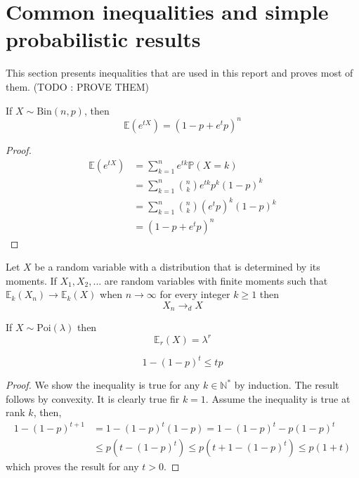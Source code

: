 \section{Common inequalities and simple probabilistic results}
This section presents inequalities that are used in this report and proves most of them. (TODO : PROVE THEM)
\begin{theorem}\label{binMGF}
	If $X \sim \text{Bin}(n, p)$, then 
	\begin{equation}
		\mathbb{E}(e^{tX}) = (1 - p + e^t p)^n
	\end{equation}
\end{theorem}
\begin{proof}
	\begin{align}
		\mathbb{E}(e^{tX}) 	&= \sum_{k=1}^n e^{tk} \mathbb{P}(X =k) \\
					&= \sum_{k=1}^n \binom{n}{k} e^{tk}p^k(1-p)^k  \\
					&= \sum_{k=1}^n \binom{n}{k} (e^tp)^k(1-p)^k  \\
					&=(1 - p + e^t p)^n
	\end{align}
\end{proof}
\begin{theorem}
	Let $X$ be a random variable with a distribution that is determined by its moments. If $X_1, X_2, ...$ are random variables with finite moments such that
	$\mathbb{E}_k(X_n) \longrightarrow \mathbb{E}_k(X)$ when $ n \to \infty$ for every integer $k \geq 1$ then
	\begin{equation}
		X_n \longrightarrow_d X
	\end{equation}
\end{theorem}
\begin{theorem}\label{th:factPois}
	If $X \sim \text{Poi}(\lambda)$ then
	\begin{equation}
		\mathbb{E}_r(X) = \lambda^r
	\end{equation}
\end{theorem}
\begin{theorem}\label{bernoulli}
	\begin{equation}
		1 - (1-p)^t \leq tp
	\end{equation}
\end{theorem}
\begin{proof}
	We show the inequality is true for any $k \in \mathbb{N}^*$ by induction. The result follows by convexity.
	\newline
	It is clearly true fir $k = 1$.
	\newline
	Assume the inequality is true at rank $k$, then,
	\begin{align}
		1 - (1-p)^{t+1} &= 1- (1-p)^t(1-p) = 1 - (1-p)^t -p(1-p)^t \\
				&\leq p(t - (1-p)^t) \leq p( t + 1 - (1-p)^t) \leq p(1 + t)
	\end{align}
	which proves the result for any $t>0$.
\end{proof}
